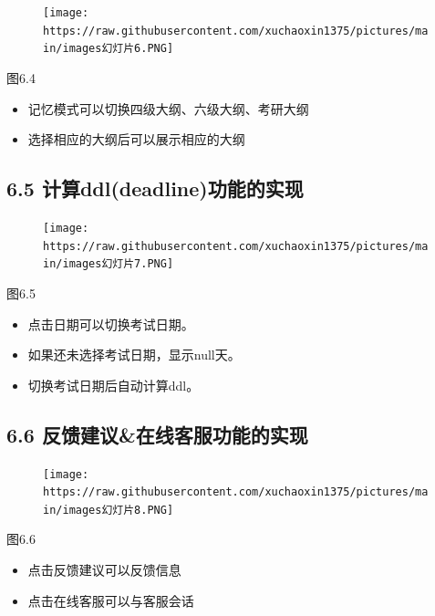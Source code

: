 \documentclass[
]{article}
\begin{document}
\begin{figure}
\centering
\texttt{[image: https://raw.githubusercontent.com/xuchaoxin1375/pictures/main/images幻灯片6.PNG]}
\caption{}
\end{figure}

图6.4

\begin{itemize}
\item
  记忆模式可以切换四级大纲、六级大纲、考研大纲
\item
  选择相应的大纲后可以展示相应的大纲
\end{itemize}

\hypertarget{65-ux8ba1ux7b97ddldeadlineux529fux80fdux7684ux5b9eux73b0}{%
\subsection{6.5
计算ddl(deadline)功能的实现}\label{65-ux8ba1ux7b97ddldeadlineux529fux80fdux7684ux5b9eux73b0}}

\begin{figure}
\centering
\texttt{[image: https://raw.githubusercontent.com/xuchaoxin1375/pictures/main/images幻灯片7.PNG]}
\caption{}
\end{figure}

图6.5

\begin{itemize}
\item
  点击日期可以切换考试日期。
\item
  如果还未选择考试日期，显示null天。
\item
  切换考试日期后自动计算ddl。
\end{itemize}

\hypertarget{66-ux53cdux9988ux5efaux8baeux5728ux7ebfux5ba2ux670dux529fux80fdux7684ux5b9eux73b0}{%
\subsection{6.6
反馈建议\&在线客服功能的实现}\label{66-ux53cdux9988ux5efaux8baeux5728ux7ebfux5ba2ux670dux529fux80fdux7684ux5b9eux73b0}}

\begin{figure}
\centering
\texttt{[image: https://raw.githubusercontent.com/xuchaoxin1375/pictures/main/images幻灯片8.PNG]}
\caption{}
\end{figure}

图6.6

\begin{itemize}
\item
  点击反馈建议可以反馈信息
\item
  点击在线客服可以与客服会话
\end{itemize}
\end{document}
